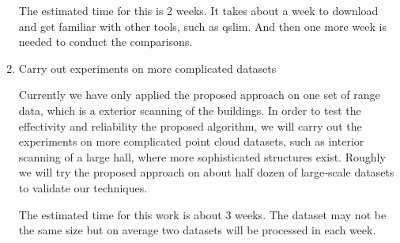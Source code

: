 \documentclass[12pt,letterpaper]{article}
\begin{document}
\begin{enumerate}
The estimated time for this is 2 weeks.
It takes about a week to download and get familiar with other tools, such as qslim. And then one more
week is needed to conduct the comparisons.

\item Carry out experiments on more complicated datasets

Currently we have only applied the proposed approach on one set of range data, which is a
exterior scanning of the buildings.
In order to test the effectivity and reliability the proposed algorithm,
we will carry out the experiments on more complicated point cloud datasets, such as
interior scanning of a large hall, where more sophisticated structures exist.
Roughly we will try the proposed approach on about half dozen of large-scale datasets to
validate our techniques.

The estimated time for this work is about 3 weeks.
The dataset may not be the same size but on average two datasets will be processed in each week.

\end{enumerate}


\newpage



\newpage


\end{document}
